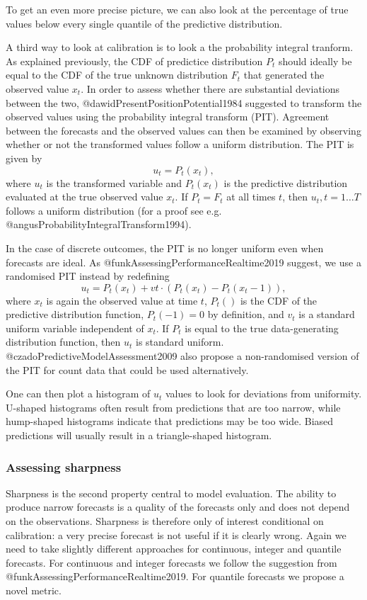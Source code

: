 \documentclass[article]{jss}
\begin{document}
To get an even more precise picture, we can also look at the percentage of true values below every single quantile of the predictive distribution.

A third way to look at calibration is to look a the probability integral tranform. As explained previously, the CDF of predictice distribution $P_t$ should ideally be equal to the CDF of the true unknown distribution $F_t$ that generated the observed value $x_t$. In order to assess whether there are substantial deviations between the two, @dawidPresentPositionPotential1984 suggested to transform the observed values using the probability integral transform (PIT). Agreement between the forecasts and the observed values can then be examined by observing whether or not the transformed values follow a uniform distribution. The PIT is given by 
$$u_t = P_t (x_t),$$
where $u_t$ is the transformed variable and $P_t(x_t)$ is the predictive distribution evaluated at the true observed value $x_t$. If $P_t = F_t$ at all times $t$, then $u_t, t = 1 \dots T$ follows a uniform distribution (for a proof see e.g. @angusProbabilityIntegralTransform1994). 

In the case of discrete outcomes, the PIT is no longer uniform even when forecasts are ideal. As @funkAssessingPerformanceRealtime2019 suggest, we use a randomised PIT instead by redefining 
$$u_t = P_t(x_t) + vt \cdot (P_t(x_t) - P_t(x_t - 1) ),$$
where $x_t$ is again the observed value at time $t$, $P_t()$ is the CDF of the predictive distribution function, $P_t (-1) = 0$ by definition, and $v_t$ is a standard uniform variable independent of $x_t$. If $P_t$ is equal to the true data-generating distribution function, then $u_t$ is standard uniform. @czadoPredictiveModelAssessment2009 also propose a non-randomised version of the PIT for count data that could be used alternatively. 

One can then plot a histogram of $u_t$ values to look for deviations from uniformity. U-shaped histograms often result from predictions that are too narrow, while hump-shaped histograms indicate that predictions may be too wide. Biased predictions will usually result in a triangle-shaped histogram. 

\subsubsection{Assessing sharpness}

Sharpness is the second property central to model evaluation. The ability to produce narrow forecasts is a quality of the forecasts only and does not depend on the observations. Sharpness is therefore only of interest conditional on calibration: a very precise forecast is not useful if it is clearly wrong. Again we need to take slightly different approaches for continuous, integer and quantile forecasts. For continuous and integer forecasts we follow the suggestion from @funkAssessingPerformanceRealtime2019. For quantile forecasts we propose a novel metric. 
\end{document}
